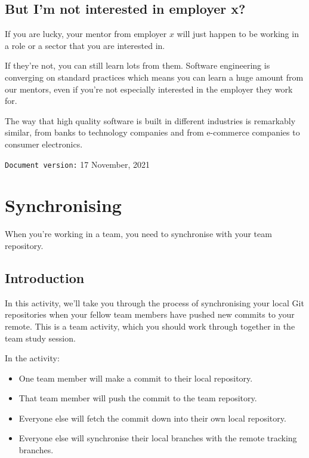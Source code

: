 \documentclass[
]{book}
\providecommand{\tightlist}{%
  \setlength{\itemsep}{0pt}\setlength{\parskip}{0pt}}
\begin{document}
\hypertarget{dontcare}{%
\section{But I'm not interested in employer x?}\label{dontcare}}

If you are lucky, your mentor from employer \(x\) will just happen to be working in a role or a sector that you are interested in.

If they're not, you can still learn lots from them. Software engineering is converging on standard practices which means you can learn a huge amount from our mentors, even if you're not especially interested in the employer they work for.

The way that high quality software is built in different industries is remarkably similar, from banks to technology companies and from e-commerce companies to consumer electronics.

\texttt{Document\ version:} 17 November, 2021

\hypertarget{syncing}{%
\chapter{Synchronising}\label{syncing}}

When you're working in a team, you need to synchronise with your team repository.

\hypertarget{syncintro}{%
\section{Introduction}\label{syncintro}}

In this activity, we'll take you through the process of synchronising your local Git repositories when your fellow team members have pushed new commits to your remote. This is a team activity, which you should work through together in the team study session.

In the activity:

\begin{itemize}
\tightlist
\item
  One team member will make a commit to their local repository.
\item
  That team member will push the commit to the team repository.
\item
  Everyone else will fetch the commit down into their own local repository.
\item
  Everyone else will synchronise their local branches with the remote tracking branches.
\end{itemize}
\end{document}
